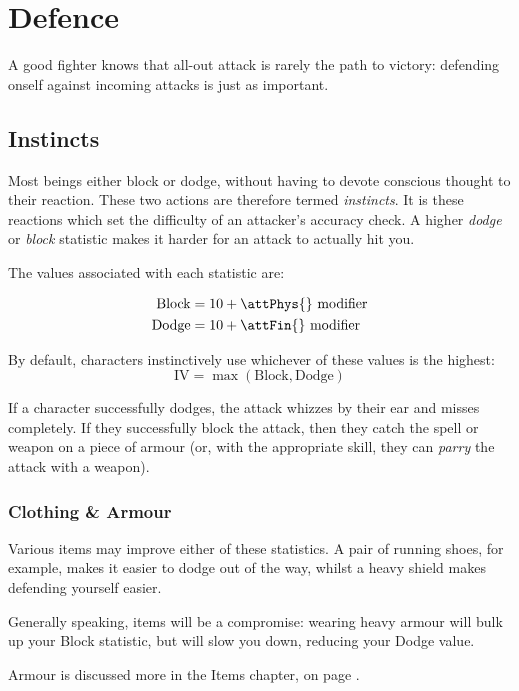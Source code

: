 
\section{Defence}\label{S:Accuracy}\label{S:Defence}

A good fighter knows that all-out attack is rarely the path to victory: defending onself against incoming attacks is just as important. 

\subsection{Instincts} \label{S:AC}

Most beings either block or dodge, without having to devote conscious thought to their reaction. These two actions are therefore termed {\it instincts}. It is these reactions which set the difficulty of an attacker's accuracy check. A higher {\it dodge} or {\it block} statistic makes it harder for an attack to actually hit you. 

The values associated with each statistic are:

\begin{align*} 
\text{Block} &= 10 + \text{\attPhys{} modifier} 
\\
\text{Dodge} &= 10 + \text{\attFin{} modifier} 
\end{align*}

By default, characters instinctively use whichever of these values is the highest:
$$ \text{IV} = \max \left( \text{Block}, \text{Dodge} \right)$$

If a character successfully dodges, the attack whizzes by their ear and misses completely. If they successfully block the attack, then they catch the spell or weapon on a piece of armour (or, with the appropriate skill, they can {\it parry} the attack with a weapon). 

\subsubsection{Clothing \& Armour}

Various items may improve either of these statistics. A pair of running shoes, for example, makes it easier to dodge out of the way, whilst a heavy shield makes defending yourself easier. 

Generally speaking, items will be a compromise: wearing heavy armour will bulk up your Block statistic, but will slow you down, reducing your Dodge value. 

Armour is discussed more in the Items chapter, on page \pageref{S:Armour}.

